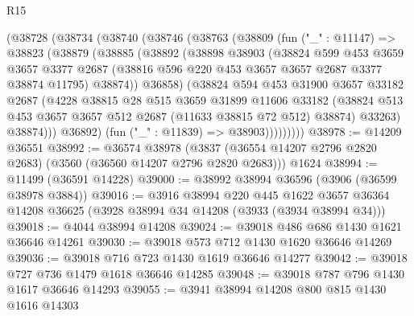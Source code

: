 \begin{lexlean}{R15}
\begin{coremodule}
        (@38728
          (@38734
            (@38740
              (@38746
                (@38763
                  (@38809
                    (fun ("_" : @11147) =>
                    @38823
                      (@38879
                        (@38885
                          (@38892
                            (@38898
                              @38903
                              (@38824
                                @599
                                @453
                                @3659
                                @3657
                                @3377
                                @2687
                                (@38816 @596 @220 @453 @3657 @3657 @2687 @3377 @38874 @11795)
                                @38874))
                            @36858)
                          (@38824
                            @594
                            @453
                            @31900
                            @3657
                            @33182
                            @2687
                            (@4228
                              @38815
                              @28
                              @515
                              @3659
                              @31899
                              @11606
                              @33182
                              (@38824
                                @513
                                @453
                                @3657
                                @3657
                                @512
                                @2687
                                (@11633 @38815 @72 @512)
                                @38874)
                              @33263)
                            @38874)))
                      @36892)
                    (fun ("_" : @11839) => @38903)))))))))
@38978 := @14209 @36551
@38992 := @36574
    @38978
    (@3837 (@36554 @14207 @2796 @2820 @2683) (@3560 (@36560 @14207 @2796 @2820 @2683)))
    @1624
@38994 := @11499 (@36591 @14228)
@39000 := @38992 @38994 @36596 (@3906 (@36599 @38978 @3884))
@39016 := @3916
    @38994
    @220
    @445
    @1622
    @3657
    @36364
    @14208
    @36625
    (@3928 @38994 @34 @14208 (@3933 (@3934 @38994 @34)))
@39018 := @4044 @38994 @14208
@39024 := @39018 @486 @686 @1430 @1621 @36646 @14261
@39030 := @39018 @573 @712 @1430 @1620 @36646 @14269
@39036 := @39018 @716 @723 @1430 @1619 @36646 @14277
@39042 := @39018 @727 @736 @1479 @1618 @36646 @14285
@39048 := @39018 @787 @796 @1430 @1617 @36646 @14293
@39055 := @3941 @38994 @14208 @800 @815 @1430 @1616 @14303

\end{coremodule}
\end{lexlean}
